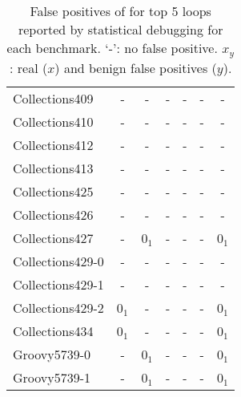 \begin{table}
\begin{tabular}{lcccccc}
Collections409           &   -                  & -                           & -                       & -                     &   -             & -\\  	
Collections410           &   -                  & -                           & -                       & -                     &   -             & -\\  	
Collections412           &   -                  & -                           & -                       & -                     &   -             & -\\  	
Collections413           &   -                  & -                           & -                       & -                     &   -             & -\\  	
Collections425           &   -                  & -                           & -                       & -                     &   -             & -\\  	
Collections426           &   -                  & -                           & -                       & -                     &   -             & -\\  	
Collections427           &   -                  & 0$_1$                       & -                       & -                     &   -             &0$_1$\\
Collections429-0         &   -                  & -                           & -                       & -                     &   -             & -\\  	
Collections429-1         &   -                  & -                           & -                       & -                     &   -             & -\\  	
Collections429-2         &   0$_1$              & -                           & -                       & -                     &   -             &0$_1$\\  	
Collections434           &   0$_1$              & -                           & -                       & -                     &   -             &0$_1$\\  	
\midrule
Groovy5739-0             &   -                  & 0$_1$                       & -                       & -                     &   -             &0$_1$\\
Groovy5739-1             &   -                  & 0$_1$                       & -                       & -                     &   -             &0$_1$\\
\bottomrule
   \end{tabular}
  \caption{False positives of \Tool for top 5 loops reported by 
    statistical debugging for each benchmark. `-': no false positive. $x_y$: real ($x$) and benign false positives ($y$).
}
  \label{tab:top5}
\end{table}
